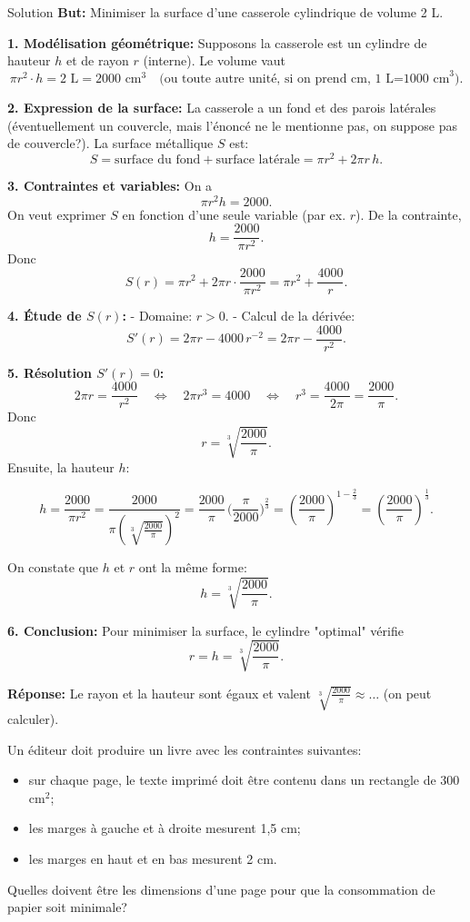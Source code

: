 \documentclass[a4paper,12pt]{article}
\begin{document}
\begin{solutionbox}{Solution}
\textbf{But:} Minimiser la surface d'une casserole cylindrique de volume 2 L.  

\textbf{1. Modélisation géométrique:}  
Supposons la casserole est un cylindre de hauteur $h$ et de rayon $r$ (interne). Le volume vaut  
$$
\pi r^2 \cdot h = 2\text{ L} = 2000\text{ cm}^3
\quad\text{(ou toute autre unité, si on prend cm, 1 L=1000 cm}^3\text{).}
$$

\textbf{2. Expression de la surface:}  
La casserole a un fond et des parois latérales (éventuellement un couvercle, mais l’énoncé ne le mentionne pas, on suppose pas de couvercle?).  
La surface métallique $S$ est:  
$$
S = \text{surface du fond} + \text{surface latérale}
= \pi r^2 + 2\pi r \,h.
$$

\textbf{3. Contraintes et variables:}  
On a 
$$
\pi r^2 h = 2000.
$$
On veut exprimer $S$ en fonction d’une seule variable (par ex. $r$).  
De la contrainte,  
$$
h = \frac{2000}{\pi r^2}.
$$
Donc  
$$
S(r) = \pi r^2 + 2\pi r \cdot \frac{2000}{\pi r^2}
= \pi r^2 + \frac{4000}{r}.
$$

\textbf{4. Étude de $S(r)$:}  
- Domaine: $r>0$.  
- Calcul de la dérivée:  
$$
S'(r)=2\pi r - 4000\,r^{-2}
=2\pi r - \frac{4000}{r^2}.
$$

\textbf{5. Résolution $S'(r)=0$:}  
$$
2\pi r = \frac{4000}{r^2}
\quad\Longleftrightarrow\quad
2\pi r^3 =4000
\quad\Longleftrightarrow\quad
r^3 = \frac{4000}{2\pi}=\frac{2000}{\pi}.
$$
Donc
$$
r= \sqrt[3]{\frac{2000}{\pi}}.
$$
Ensuite, la hauteur $h$:

$$
h = \frac{2000}{\pi r^2}
= \frac{2000}{\pi \left(\sqrt[3]{\frac{2000}{\pi}}\right)^2}
= \frac{2000}{\pi}\,\biggl(\frac{\pi}{2000}\biggr)^{\tfrac{2}{3}}
= \left(\frac{2000}{\pi}\right)^{1 - \frac{2}{3}}= \left(\frac{2000}{\pi}\right)^{\tfrac{1}{3}}.
$$

On constate que $h$ et $r$ ont la même forme: 
$$
h= \sqrt[3]{\frac{2000}{\pi}}.
$$

\textbf{6. Conclusion:}  
Pour minimiser la surface, le cylindre "optimal" vérifie
$$
r= h= \sqrt[3]{\frac{2000}{\pi}}.
$$

\medskip
\textbf{Réponse:}  
Le rayon et la hauteur sont égaux et valent $\sqrt[3]{\tfrac{2000}{\pi}}\approx \dots$ (on peut calculer). 
\end{solutionbox}

\begin{exercice}[title=Exercice 28 -- {[Modéliser, Calculer]}]
Un éditeur doit produire un livre avec les contraintes suivantes:
\begin{itemize}
  \item sur chaque page, le texte imprimé doit être contenu dans un rectangle de 300 cm$^2$;
  \item les marges à gauche et à droite mesurent 1,5 cm;
  \item les marges en haut et en bas mesurent 2 cm.
\end{itemize}
Quelles doivent être les dimensions d’une page pour que la consommation de papier soit minimale?
\end{exercice}
\end{document}
